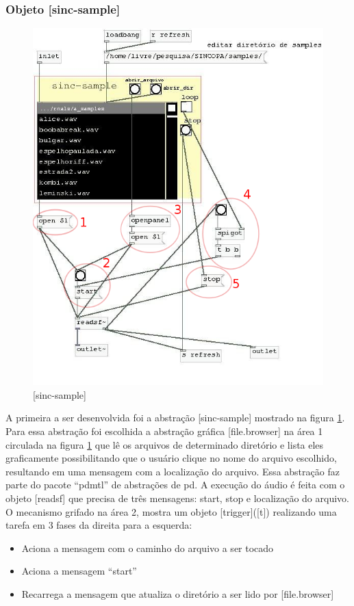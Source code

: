\documentclass[draft]{ppgmus}
\begin{document}
\subsubsection{Objeto [sinc-sample]}



\begin{figure}
\includegraphics[scale=.5]{sinc-sample}
\caption{[sinc-sample]}
\label{[sinc-sample]}
\end{figure}



A primeira a ser desenvolvida foi a abstração [sinc-sample] mostrado na figura
\ref{[sinc-sample]}. Para essa abstração foi escolhida a abstração gráfica 
[file.browser] 
na área 1 circulada na figura \ref{[sinc-sample]} que lê os arquivos de determinado
 diretório e lista eles graficamente possibilitando que
o usuário clique no nome do arquivo escolhido, resultando em uma mensagem com a 
localização
do arquivo. Essa abstração faz parte do pacote ``pdmtl'' de abstrações de pd.
A execução do áudio é feita com o objeto [readsf\texttildelow] que precisa de três mensagens:
start, stop e localização do arquivo. O mecanismo grifado na área 2, mostra
um objeto [trigger]([t]) realizando uma tarefa em 3 fases da direita para a esquerda:
\begin{itemize}
 \item Aciona a mensagem com o caminho do arquivo a ser tocado
 \item Aciona a mensagem ``start''
 \item Recarrega a mensagem que atualiza o diretório a ser lido por [file.browser]
\end{itemize}
\end{document}
